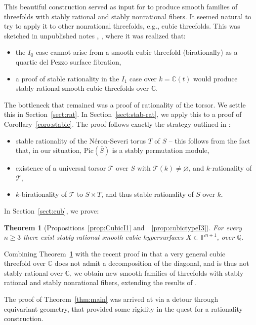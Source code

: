 \documentclass[12pt, reqno]{amsart}
\theoremstyle{plain}
\newtheorem{theo}[prop]{Theorem}
\theoremstyle{remark}
\theoremstyle{definition}
\numberwithin{equation}{section}
\def\cT{{\mathcal T}}
\def\bP{{\mathbb P}}
\def\bQ{{\mathbb Q}}
\def\bC{{\mathbb C}}
\def\Pic{\mathrm{Pic}}
\begin{document}
This beautiful construction served as input for \cite{HKT-duke} to produce smooth families of threefolds with stably rational and stably nonrational fibers. It seemed natural to try to apply it to other nonrational threefolds, e.g., cubic threefolds. This was sketched in unpublished notes \cite{HT-1}, \cite{HT-2}, where it was realized that: 
\begin{itemize}
    \item the $I_0$ case cannot arise from a smooth cubic threefold (birationally) as a quartic del Pezzo surface fibration,
    \item a proof of stable rationality in the $I_1$ case over $k=\bC(t)$ would produce stably rational smooth cubic threefolds over $\bC$. 
\end{itemize}
The bottleneck that remained was a proof of rationality of the torsor.  We settle this in Section~\ref{sect:rat}. 
In Section~\ref{sect:stab-rat}, we apply this to a proof of Corollary~\ref{coro:stable}. The proof follows exactly the strategy outlined in \cite[Section 1]{bctspstably}:
\begin{itemize}
\item stable rationality of the N\'eron-Severi torus $T$ of $S$ -- this follows from the fact that, in our situation, $\Pic(\bar{S})$ is a stably permutation module, 
\item existence of a universal torsor $\cT$ over $S$ with $\cT(k)\neq \varnothing$, and $k$-rationality of $\cT$, 
\item $k$-birationality of $\cT$ to $S\times T$, and thus stable rationality of $S$ over $k$. 
\end{itemize}


In Section~\ref{sect:cub}, we prove:
\begin{theo}[Propositions~\ref{prop:CubicI1} and~~\ref{prop:cubictypeI3}]
\label{thm:main3}
For every $n\ge 3$ there exist stably rational smooth cubic hypersurfaces $X\subset \bP^{n+1}$, over 
$\bQ$. 
\end{theo}
Combining Theorem~\ref{thm:main3} with the recent proof in \cite{cubicmatroid} that a very general cubic threefold over $\bC$ does not admit a decomposition of the
diagonal, and is thus not stably rational over $\bC$, we obtain new smooth families of threefolds with stably rational and stably nonrational fibers, extending the results of \cite{HKT-duke}.

The proof of Theorem~\ref{thm:main} was arrived at via a detour through equivariant geometry, that provided some rigidity in the quest for a rationality construction.  
\end{document}
